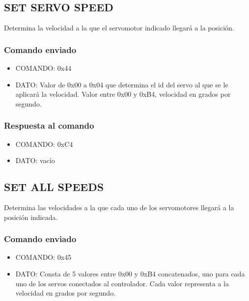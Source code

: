 \documentclass[a4paper,10pt]{article}
\begin{document}
\subsection{SET SERVO SPEED}
\label{set_servo_speed}

Determina la velocidad a la que el servomotor indicado llegar\'a a la posici\'on.

\subsubsection*{Comando enviado}

\begin{itemize}
	\item{COMANDO:} 0x44
	\item{DATO:} Valor de 0x00 a 0x04 que determina el id del servo al que se le aplicar\'a la velocidad.
	Valor entre 0x00 y 0xB4, velocidad en grados por segundo.
\end{itemize}

\subsubsection*{Respuesta al comando}

\begin{itemize}
	\item{COMANDO:} 0xC4
	\item{DATO:} vac\'io
\end{itemize}

\subsection{SET ALL SPEEDS}
\label{set_all_speeds}

Determina las velocidades a la que cada uno de los servomotores llegar\'a a la posici\'on indicada.

\subsubsection*{Comando enviado}

\begin{itemize}
	\item{COMANDO:} 0x45
	\item{DATO:} Consta de 5 valores entre 0x00 y 0xB4 concatenados, uno para cada uno de los servos conectados al controlador.
	Cada valor representa a la velocidad en grados por segundo.
\end{itemize}
\end{document}
